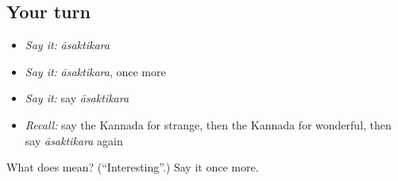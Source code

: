 \subsection*{Your turn}
\begin{itemize}
\raggedright
  \item \emph{Say it:} \emph{āsaktikara}
  \item \emph{Say it:} \emph{āsaktikara}, once more
  \item \emph{Say it:} say \emph{āsaktikara}
  \item \emph{Recall:} say the Kannada for strange, then the Kannada for wonderful, then say \emph{āsaktikara} again
\end{itemize}

\begin{tcolorbox}[breakable,colback=teal!4,colframe=teal!35!black,title={Before you move on}]
What does  mean? (\textquotedblleft{}Interesting\textquotedblright{}.) Say it once more.
\end{tcolorbox}
